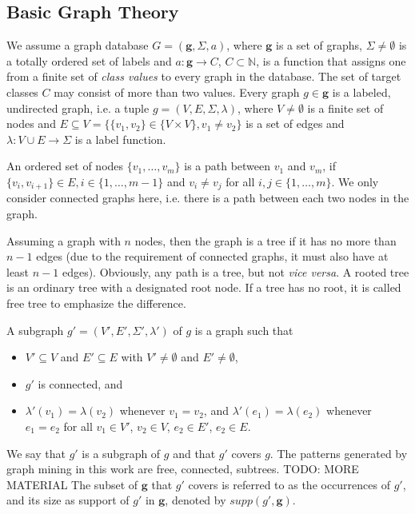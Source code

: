 \documentclass{article}
\begin{document}
\subsection{Basic Graph Theory}
\label{ss:BasicGraphTheory}
We assume a graph database $G=(\mathbf{g}, \Sigma, a)$, where 
$\mathbf{g}$ is a set of graphs, 
$\Sigma \ne \emptyset$  is a totally ordered set of labels and 
%
$a: \mathbf{g} \rightarrow C$, $C \subset \mathbb{N}$, is a function that assigns one from a finite set of \emph{class values} to every graph in the database. 
The set of target classes $C$ may consist of more than two values.
%
Every graph $g \in \mathbf{g}$ is a labeled, undirected graph, i.e. a tuple $g=(V,E,\Sigma,\lambda)$, where 
$V\ne \emptyset$ is a finite set of nodes and 
$E \subseteq V = \{\{v_1, v_2\} \in \{V \times V\}, v_1 \ne v_2\}$ is a set of edges and 
$\lambda: V\cup E \rightarrow \Sigma$ is a label function. 

An ordered set of nodes $\{ v_1, \ldots, v_m\}$ is a path between $v_1$ and $v_m$, if $\{v_i, v_{i+1}\} \in E, i \in \{1,\ldots,m-1\}$ and $v_i \neq v_j$ for all $i,j\in \{1,\ldots,m\}$. 
We only consider connected graphs here, i.e. there is a path between each two nodes in the graph.

Assuming a graph with $n$ nodes, then the graph is a tree if it has no more than $n-1$ edges (due to the requirement of connected graphs, it must also have at least $n-1$ edges).
Obviously, any path is a tree, but not \emph{vice versa}.
A rooted tree is an ordinary tree with a designated root node.
If a tree has no root, it is called free tree to emphasize the difference.

A subgraph $g'=(V',E',\Sigma',\lambda')$ of $g$ is a graph such that 
\begin{itemize}
  \item $V' \subseteq V$ and $E' \subseteq E$ with $V' \ne \emptyset$ and $E' \ne \emptyset$,
  \item $g'$ is connected, and
  \item $\lambda'(v_1)=\lambda(v_2)$ whenever $v_1=v_2$, and $\lambda'(e_1)=\lambda(e_2)$ whenever $e_1=e_2$ for all $v_1 \in V'$, $v_2 \in V$, $e_2 \in E'$, $e_2 \in E$.
\end{itemize}
We say that $g'$ is a subgraph of $g$ and that $g'$ covers $g$. The patterns generated by graph mining in this work are free, connected, subtrees. TODO: MORE MATERIAL
The subset of $\mathbf{g}$ that $g'$ covers is referred to as the occurrences of $g'$, and its size as support of $g'$ in $\mathbf{g}$, denoted by $supp(g', \mathbf{g})$.
\end{document}
